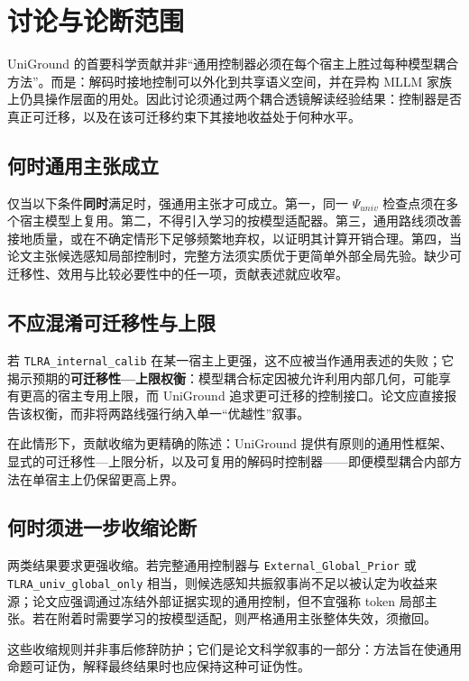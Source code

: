 \section{讨论与论断范围}
\label{sec:discussion}

UniGround 的首要科学贡献并非``通用控制器必须在每个宿主上胜过每种模型耦合方法''。而是：解码时接地控制可以外化到共享语义空间，并在异构 MLLM 家族上仍具操作层面的用处。因此讨论须通过两个耦合透镜解读经验结果：控制器是否真正可迁移，以及在该可迁移约束下其接地收益处于何种水平。

\subsection{何时通用主张成立}

仅当以下条件\textbf{同时}满足时，强通用主张才可成立。第一，同一 $\Psi_{\mathit{univ}}$ 检查点须在多个宿主模型上复用。第二，不得引入学习的按模型适配器。第三，通用路线须改善接地质量，或在不确定情形下足够频繁地弃权，以证明其计算开销合理。第四，当论文主张候选感知局部控制时，完整方法须实质优于更简单外部全局先验。缺少可迁移性、效用与比较必要性中的任一项，贡献表述就应收窄。

\subsection{不应混淆可迁移性与上限}

若 \texttt{TLRA\_internal\_calib} 在某一宿主上更强，这不应被当作通用表述的失败；它揭示预期的\textbf{可迁移性—上限权衡}：模型耦合标定因被允许利用内部几何，可能享有更高的宿主专用上限，而 UniGround 追求更可迁移的控制接口。论文应直接报告该权衡，而非将两路线强行纳入单一``优越性''叙事。

在此情形下，贡献收缩为更精确的陈述：UniGround 提供有原则的通用性框架、显式的可迁移性—上限分析，以及可复用的解码时控制器——即便模型耦合内部方法在单宿主上仍保留更高上界。

\subsection{何时须进一步收缩论断}

两类结果要求更强收缩。若完整通用控制器与 \texttt{External\_Global\_Prior} 或 \texttt{TLRA\_univ\_global\_only} 相当，则候选感知共振叙事尚不足以被认定为收益来源；论文应强调通过冻结外部证据实现的通用控制，但不宜强称 token 局部主张。若在附着时需要学习的按模型适配，则严格通用主张整体失效，须撤回。

这些收缩规则并非事后修辞防护；它们是论文科学叙事的一部分：方法旨在使通用命题可证伪，解释最终结果时也应保持这种可证伪性。
